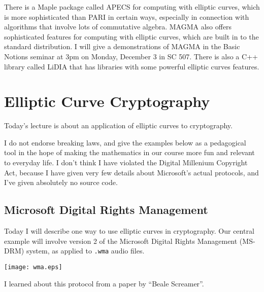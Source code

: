 \documentclass[11pt]{report}
\begin{document}
There is a Maple package called APECS for computing with elliptic
curves, which is more sophisticated than PARI in certain ways,
especially in connection with algorithms that involve lots of
commutative algebra.  MAGMA also offers sophisticated features for
computing with elliptic curves, which are built in to the standard
distribution.  I will give a demonstrations of MAGMA in the Basic
Notions seminar at 3pm on Monday, December 3 in SC 507. There is also
a C++ library called LiDIA that has libraries with some powerful
elliptic curves features.







\chapter{Elliptic Curve Cryptography}

Today's lecture is about an application of elliptic curves to
cryptography.

 I do not endorse breaking laws, and give the examples
below as a pedagogical tool in the hope of making the mathematics in
our course more fun and relevant to everyday life.  I don't think I
have violated the Digital Millenium Copyright Act, because I have
given very few details about Microsoft's actual protocols, and I've
given absolutely no source code.

\section{Microsoft Digital Rights Management}
Today I will describe one way to use elliptic curves in cryptography.
Our central example will involve
version 2 of the Microsoft Digital Rights Management (MS-DRM) system,
as applied to {\tt .wma} audio files.
\begin{center}
  \texttt{[image: wma.eps]}
\end{center}
I learned about this protocol from
a paper by ``Beale Screamer''.
\end{document}
